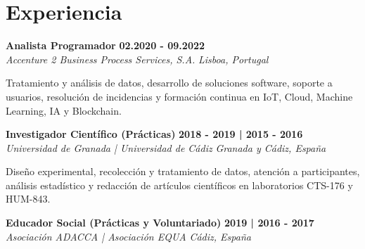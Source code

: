 \documentclass[letterpaper,11pt]{article}
\begin{document}
\section{Experiencia}

    \noindent
    \begin{minipage}[t]{0.99\textwidth}
        {\large \textbf{Analista Programador}} 
        \hfill 
        {\small \textbf{02.2020 - 09.2022}} \\
        
        {\color{detailgray}\textit{Accenture 2 Business Process Services, S.A.}} 
        \hfill 
        {\color{detailgray}\small \textit{Lisboa, Portugal}}
    \end{minipage}
    
    \vspace{0.1cm}
    
    {\small Tratamiento y análisis de datos, desarrollo de soluciones software, soporte a usuarios, resolución de incidencias y formación continua en IoT, Cloud, Machine Learning, IA y Blockchain.}
    
    \vspace{0.4cm}
    \noindent
    \begin{minipage}[t]{0.99\textwidth}
        {\large \textbf{Investigador Científico (Prácticas)}} 
        \hfill 
        {\small \textbf{2018 - 2019 | 2015 - 2016}} \\
        
        {\color{detailgray}\textit{Universidad de Granada | Universidad de Cádiz}} 
        \hfill 
        {\color{detailgray}\small \textit{Granada y Cádiz, España}}
    \end{minipage}
    
    \vspace{0.1cm}
    
    {\small Diseño experimental, recolección y tratamiento de datos, atención a participantes, análisis estadístico y redacción de artículos científicos en laboratorios CTS-176 y HUM-843.}
    
    \vspace{0.4cm}
    \noindent
    \begin{minipage}[t]{0.99\textwidth}
        {\large \textbf{Educador Social (Prácticas y Voluntariado)}} 
        \hfill 
        {\small \textbf{2019 | 2016 - 2017}} \\
        
        {\color{detailgray}\textit{Asociación ADACCA | Asociación EQUA}} 
        \hfill 
        {\color{detailgray}\small \textit{Cádiz, España}}
    \end{minipage}
    
\end{document}
